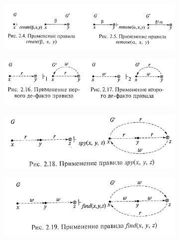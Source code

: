 \begin{figure}[H]
	\centering
	\begin{subfigure}[b]{0.4\textwidth}
		\includegraphics[width=\textwidth]{img/10.png}
		\captionsetup{labelformat=empty}
	\end{subfigure}
	\begin{subfigure}[b]{0.4\textwidth}
		\includegraphics[width=\textwidth]{img/3.png}
		\captionsetup{labelformat=empty}
	\end{subfigure}
\end{figure}

\begin{figure}[H]
	\centering
	\begin{subfigure}[b]{0.4\textwidth}
		\includegraphics[width=\textwidth]{img/4.png}
		\captionsetup{labelformat=empty}
	\end{subfigure}
	\begin{subfigure}[b]{0.4\textwidth}
		\includegraphics[width=\textwidth]{img/5.png}
		\captionsetup{labelformat=empty}
	\end{subfigure}
\end{figure}

